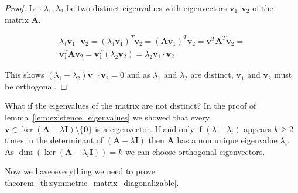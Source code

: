 \documentclass[a4paper]{IEEEtran}
\begin{document}
\begin{proof}
	Let $\lambda_1, \lambda_2$ be two distinct eigenvalues with eigenvectors $\mathbf{v}_1, \mathbf{v}_2$ of the matrix $\mathbf{A}$.
	
	\begin{align*}
		\lambda_1 \mathbf{v}_1 \cdot \mathbf{v}_2 = (\lambda_1\mathbf{v}_1)^T \mathbf{v}_2 = (\mathbf{Av}_1)^T \mathbf{v}_2 = \mathbf{v}_1^T \mathbf{A}^T \mathbf{v}_2 =\\
		\mathbf{v}_1^T \mathbf{A} \mathbf{v}_2 = \mathbf{v}_1^T (\lambda_2 \mathbf{v}_2) = \lambda_2 \mathbf{v}_1 \cdot \mathbf{v}_2
	\end{align*}
	
	This shows $(\lambda_1 - \lambda_2) \mathbf{v}_1 \cdot \mathbf{v}_2 = 0$ and as $\lambda_1$ and $\lambda_2$ are distinct, $\mathbf{v}_1$ and $\mathbf{v}_2$ must be orthogonal.
\end{proof}

What if the eigenvalues of the matrix are not distinct? In the proof of lemma~\ref{lem:existence_eigenvalues} we showed that every $\mathbf{v} \in \ker(\mathbf{A} - \lambda\mathbf{I}) \setminus \{\mathbf{0}\}$ is a eigenvector. If and only if $(\lambda - \lambda_i)$ appears $k \geq 2$ times in the determinant of $(\mathbf{A} - \lambda\mathbf{I})$ then $\mathbf{A}$ has a non unique eigenvalue $\lambda_i$. As $\dim(\ker(\mathbf{A} - \lambda_i\mathbf{I})) = k$ we can choose orthogonal eigenvectors. 


Now we have everything we need to prove theorem~\ref{th:symmetric_matrix_diagonalizable}. 
\end{document}
